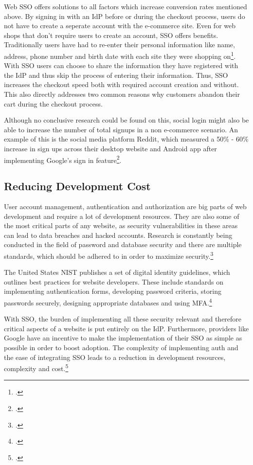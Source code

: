 Web \ac{SSO} offers solutions to all factors which increase conversion rates mentioned above.
By signing in with an \ac{IdP} before or during the checkout process, users do not have to create a seperate
account with the e-commerce site. Even for web shops that don't require users to create an account, \ac{SSO} offers benefits.
Traditionally users have had to re-enter their personal information like name, address, phone number and birth date
with each site they were shopping on\footcite[Cp. ][p. 24]{Beltran2016}. With \ac{SSO} users can choose to share the information they have
registered with the \ac{IdP} and thus skip the process of entering their information.
Thus, \ac{SSO} increases the checkout speed both with required account creation and without.
This also directly addresses two common reasons why customers abandon their cart during the checkout process.

Although no conclusive research could be found on this, social login might also be able to increase the number of total signups
in a non e-commerce scenario. An example of this is the social media platform Reddit, which measured a 50\% - 60\% increase
in sign ups across their desktop website and Android app after implementing Google's sign in feature\footcite[Cp.][]{GoogleReddit}.

\subsection{Reducing Development Cost}

User account management, authentication and authorization are big parts of web development and require
a lot of development resources. They are also some of the most critical parts of any website,
as security vulnerabilities in these areas can lead to data breaches and hacked accounts.
Research is constantly being conducted in the field of password and database security and there are multiple
standards, which should be adhered to in order to maximize security.\footcite[Cp.][]{Poza2021}

The United States \ac{NIST} publishes a set of digital identity guidelines, which outlines best practices
for website developers. These include standards on implementing authentication forms,
developing password criteria, storing passwords securely, designing appropriate databases and using \ac{MFA}.\footcite[Cp.][]{Poza2021}

With \ac{SSO}, the burden of implementing all these security relevant and therefore critical aspects of a website is put entirely on the \ac{IdP}. 
Furthermore, providers like Google
have an incentive to make the implementation of their \ac{SSO} as simple as possible in order to boost adoption.
The complexity of implementing auth and the ease of integrating \ac{SSO} leads to a reduction in development resources, complexity and cost.\footcite[Cp.][p. 22]{Bazaz2016}

